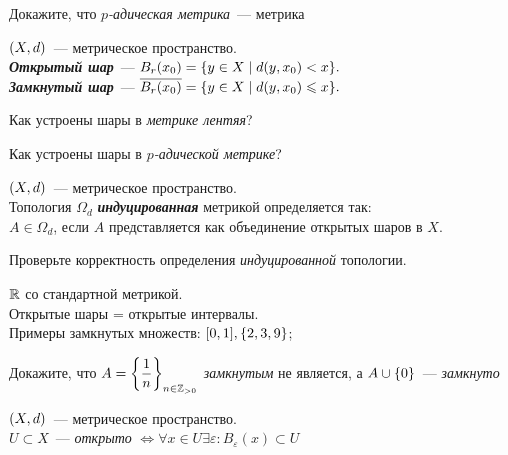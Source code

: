 \documentclass{article}
\begin{document}
    \begin{task_boxed}
        Докажите, что \textit{$p$-адическая метрика}~--- метрика
    \end{task_boxed}

    \begin{definition_boxed}
        $\lr*{X, d}$~--- метрическое пространство.\\
        \textbf{\textit{Открытый шар}}~--- $B_r(x_0) = \set*{y \in X \mid d(y, x_0) < x}.$\\
        \textbf{\textit{Замкнутый шар}}~--- $\overline{B_r(x_0)} = \set*{y \in X \mid d(y, x_0) \leqslant x}.$
    \end{definition_boxed}

    \begin{task_boxed}
        Как устроены шары в \textit{метрике лентяя}?
    \end{task_boxed}

    \begin{task_boxed}
        Как устроены шары в \textit{$p$-адической метрике}?
    \end{task_boxed}

    \begin{definition_boxed}
        $\lr*{X, d}$~--- метрическое пространство.\\
        Топология $\Omega_d$ \textbf{\textit{индуцированная}} метрикой определяется так:\\
        $A \in \Omega_d$, если $A$ представляется как объединение открытых шаров в $X$.
    \end{definition_boxed}

    \begin{task_boxed}
        Проверьте корректность определения \textit{индуцированной} топологии.
    \end{task_boxed}

    \begin{example}
        $\R$ со стандартной метрикой.\\
        Открытые шары = открытые интервалы.\\
        Примеры замкнутых множеств: $[0,1], \set*{2, 3, 9}$;
    \end{example}

    \begin{task_boxed}
        Докажите, что $A = \set*{\dfrac{1}{n}}_{n \in \Z_{>0}}$ \textit{замкнутым} не является, а
        $A \cup \set*{0}$~--- \textit{замкнуто}
    \end{task_boxed}


    \begin{task_boxed}
        $\lr*{X, d}$~--- метрическое пространство.\\
        $U \subset X$~--- \textit{открыто} $\Leftrightarrow \forall x \in U \exists \varepsilon: B_{\varepsilon}(x) \subset U$
    \end{task_boxed}
\end{document}
